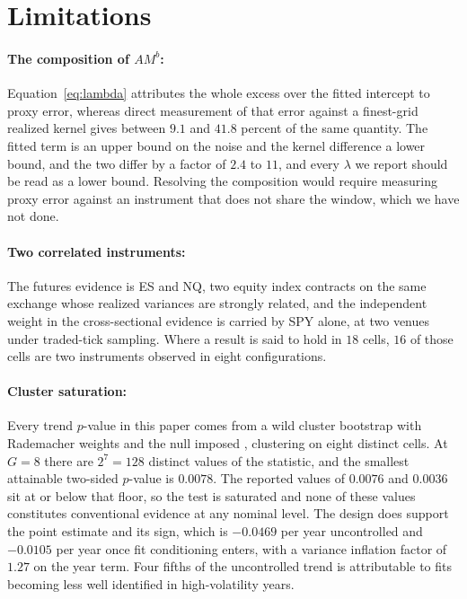 \section{Limitations}\label{sec:limitations}

\paragraph{The composition of $A M^{b}$:} Equation~\eqref{eq:lambda} attributes
the whole excess over the fitted intercept to proxy error, whereas direct
measurement of that error against a finest-grid realized kernel gives between
$9.1$ and $41.8$ percent of the same quantity. The fitted term is an upper bound %
on the noise and the kernel difference a lower bound, and the two differ by a
factor of $2.4$ to $11$, and every $\lambda$ we report should be read as a lower %
bound. Resolving the composition would require measuring proxy error against an
instrument that does not share the window, which we have not done.

\paragraph{Two correlated instruments:} The futures evidence is ES and NQ, two
equity index contracts on the same exchange whose realized variances are strongly
related, and the independent weight in the cross-sectional evidence is carried by
SPY alone, at two venues under traded-tick sampling. Where a result is said to
hold in $18$ cells, $16$ of those cells are two instruments observed in eight %
configurations.

\paragraph{Cluster saturation:} Every trend $p$-value in this paper comes from a
wild cluster bootstrap with Rademacher weights and the null
imposed \citep{cgm2008}, clustering on eight distinct cells. At $G = 8$ there are
$2^{7} = 128$ distinct values of the statistic, and the smallest attainable
two-sided $p$-value is $0.0078$. The reported values of $0.0076$ and $0.0036$ sit %
at or below that floor, so the test is saturated and none of these values
constitutes conventional evidence at any nominal level. The design does support
the point estimate and its sign, which is $-0.0469$ per year uncontrolled and %
$-0.0105$ per year once fit conditioning enters, with a variance inflation factor %
of $1.27$ on the year term. Four fifths of the uncontrolled trend is attributable %
to fits becoming less well identified in high-volatility years.

